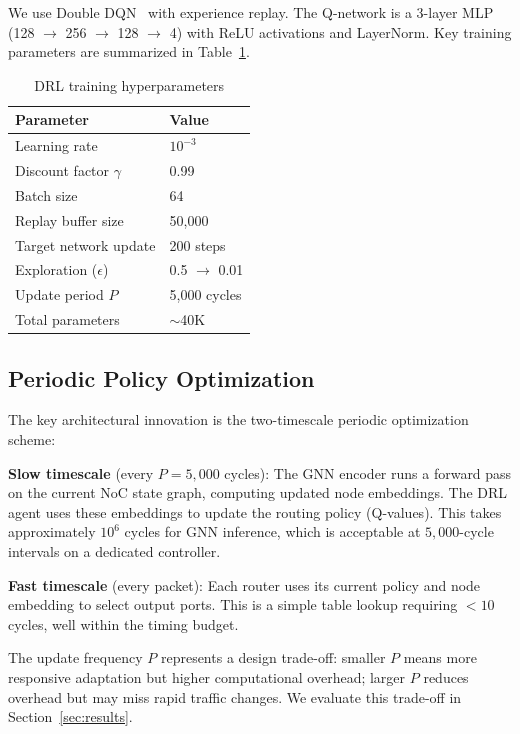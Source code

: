 We use Double DQN~\cite{ddqn2016} with experience replay. The Q-network is a 3-layer MLP (128 $\rightarrow$ 256 $\rightarrow$ 128 $\rightarrow$ 4) with ReLU activations and LayerNorm. Key training parameters are summarized in Table~\ref{tab:hyperparams}.

\begin{table}[h]
\centering
\caption{DRL training hyperparameters}
\label{tab:hyperparams}
\begin{tabular}{ll}
\toprule
\textbf{Parameter} & \textbf{Value} \\
\midrule
Learning rate & $10^{-3}$ \\
Discount factor $\gamma$ & 0.99 \\
Batch size & 64 \\
Replay buffer size & 50,000 \\
Target network update & 200 steps \\
Exploration ($\epsilon$) & 0.5 $\rightarrow$ 0.01 \\
Update period $P$ & 5,000 cycles \\
\midrule
Total parameters & $\sim$40K \\
\bottomrule
\end{tabular}
\end{table}

\subsection{Periodic Policy Optimization}

The key architectural innovation is the two-timescale periodic optimization scheme:

\textbf{Slow timescale} (every $P = 5,000$ cycles): The GNN encoder runs a forward pass on the current NoC state graph, computing updated node embeddings. The DRL agent uses these embeddings to update the routing policy (Q-values). This takes approximately $10^6$ cycles for GNN inference, which is acceptable at $5,000$-cycle intervals on a dedicated controller.

\textbf{Fast timescale} (every packet): Each router uses its current policy and node embedding to select output ports. This is a simple table lookup requiring $<10$ cycles, well within the timing budget.

The update frequency $P$ represents a design trade-off: smaller $P$ means more responsive adaptation but higher computational overhead; larger $P$ reduces overhead but may miss rapid traffic changes. We evaluate this trade-off in Section~\ref{sec:results}.
